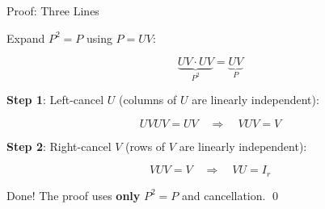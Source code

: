 \documentclass[10pt]{beamer}
\theoremstyle{definition}
\newcommand{\x}[1]{\alert{\textbf{#1}}}
\begin{document}
\begin{frame}{Proof: Three Lines}

Expand $P^2 = P$ using $P = UV$:

$$\underbrace{UV \cdot UV}_{P^2} = \underbrace{UV}_{P}$$

\vspace{0.3em}

\x{Step 1}: Left-cancel $U$ (columns of $U$ are linearly independent):

$$UVUV = UV \quad\Longrightarrow\quad VUV = V$$

\vspace{0.3em}

\x{Step 2}: Right-cancel $V$ (rows of $V$ are linearly independent):

$$VUV = V \quad\Longrightarrow\quad VU = I_r$$

\vspace{0.3em}

Done! The proof uses \x{only} $P^2 = P$ and cancellation. \qed

\end{frame}
\end{document}
